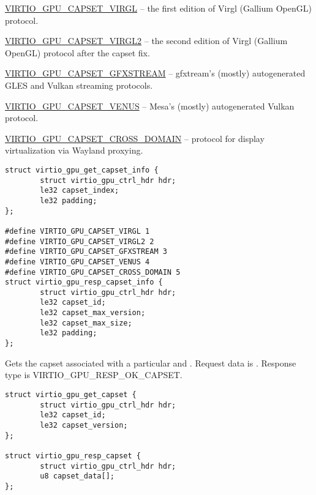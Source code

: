 \begin{description}
  \begin{itemize*}
  \item \href{https://gitlab.freedesktop.org/virgl/virglrenderer/-/blob/master/src/virgl_hw.h#L526}{VIRTIO_GPU_CAPSET_VIRGL} --
	the first edition of Virgl (Gallium OpenGL) protocol.
  \item \href{https://gitlab.freedesktop.org/virgl/virglrenderer/-/blob/master/src/virgl_hw.h#L550}{VIRTIO_GPU_CAPSET_VIRGL2} --
	the second edition of Virgl (Gallium OpenGL) protocol after the capset fix.
  \item \href{https://android.googlesource.com/device/generic/vulkan-cereal/+/refs/heads/master/protocols/}{VIRTIO_GPU_CAPSET_GFXSTREAM} --
	gfxtream's (mostly) autogenerated GLES and Vulkan streaming protocols.
  \item \href{https://gitlab.freedesktop.org/olv/venus-protocol}{VIRTIO_GPU_CAPSET_VENUS} --
	Mesa's (mostly) autogenerated Vulkan protocol.
  \item \href{https://chromium.googlesource.com/chromiumos/platform/crosvm/+/refs/heads/main/rutabaga_gfx/src/cross_domain/cross_domain_protocol.rs}{VIRTIO_GPU_CAPSET_CROSS_DOMAIN} --
	protocol for display virtualization via Wayland proxying.
  \end{itemize*}

\begin{lstlisting}
struct virtio_gpu_get_capset_info {
        struct virtio_gpu_ctrl_hdr hdr;
        le32 capset_index;
        le32 padding;
};

#define VIRTIO_GPU_CAPSET_VIRGL 1
#define VIRTIO_GPU_CAPSET_VIRGL2 2
#define VIRTIO_GPU_CAPSET_GFXSTREAM 3
#define VIRTIO_GPU_CAPSET_VENUS 4
#define VIRTIO_GPU_CAPSET_CROSS_DOMAIN 5
struct virtio_gpu_resp_capset_info {
        struct virtio_gpu_ctrl_hdr hdr;
        le32 capset_id;
        le32 capset_max_version;
        le32 capset_max_size;
        le32 padding;
};
\end{lstlisting}

\item[VIRTIO_GPU_CMD_GET_CAPSET] Gets the capset associated with a
  particular  and .  Request data is
  .  Response type is
  VIRTIO_GPU_RESP_OK_CAPSET.

\begin{lstlisting}
struct virtio_gpu_get_capset {
        struct virtio_gpu_ctrl_hdr hdr;
        le32 capset_id;
        le32 capset_version;
};

struct virtio_gpu_resp_capset {
        struct virtio_gpu_ctrl_hdr hdr;
        u8 capset_data[];
};
\end{lstlisting}


\end{description}
